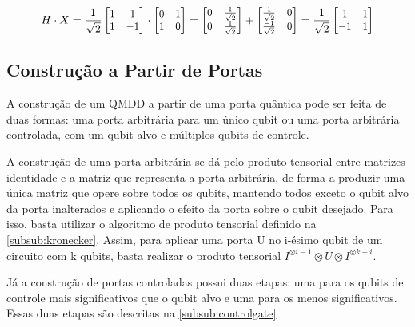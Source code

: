 \begin{equation}
  \small
  \label{eq:hxdiagram}
  H \cdot X
  =
  \frac{1}{\sqrt{2}}
  \begin{bmatrix}
    1 & 1 \\
    1 & -1
  \end{bmatrix}
  \cdot
  \begin{bmatrix}
    0 & 1 \\
    1 & 0
  \end{bmatrix}
  =
  \begin{bmatrix}
    0 & \frac{1}{\sqrt{2}} \\
    0 & \frac{1}{\sqrt{2}}
  \end{bmatrix}
  +
  \begin{bmatrix}
    \frac{1}{\sqrt{2}} & 0 \\
    \frac{-1}{\sqrt{2}} & 0
  \end{bmatrix}
  =    
  \frac{1}{\sqrt{2}}
  \begin{bmatrix}
    1 & 1 \\
    -1 & 1
  \end{bmatrix}
\end{equation}

\subsection{Construção a Partir de Portas}\label{sec:gateconstruct}

A construção de um QMDD a partir de uma porta quântica pode ser feita de duas formas: uma porta arbitrária para um único qubit ou uma porta arbitrária controlada, com um qubit alvo e múltiplos qubits de controle.

A construção de uma porta arbitrária se dá pelo produto tensorial entre matrizes identidade e a matriz que representa a porta arbitrária, de forma a produzir uma única matriz que opere sobre todos os qubits, mantendo todos exceto o qubit alvo da porta inalterados e aplicando o efeito da porta sobre o qubit desejado. Para isso, basta utilizar o algoritmo de produto tensorial definido na \cref{subsub:kronecker}. Assim, para aplicar uma porta U no i-ésimo qubit de um circuito com k qubits, basta realizar o produto tensorial $I^{\otimes i-1} \otimes U \otimes I^{\otimes k-i}$. 

Já a construção de portas controladas possui duas etapas: uma para os qubits de controle mais significativos que o qubit alvo e uma para os menos significativos. Essas duas etapas são descritas na \cref{subsub:controlgate} \cite{miller2006qmdd, kydros2025tutorial}

